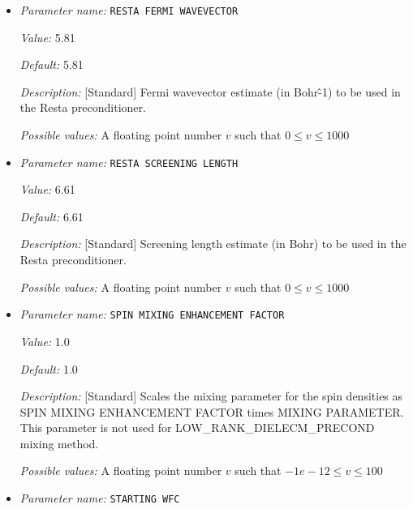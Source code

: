\begin{itemize}
{\it Possible values:} A floating point number $v$ such that $-1e-12 \leq v \leq 1$
\item {\it Parameter name:} {\tt RESTA FERMI WAVEVECTOR}
\label{parameters:SCF parameters/RESTA FERMI WAVEVECTOR}
\label{parameters:SCF_20parameters/RESTA_20FERMI_20WAVEVECTOR}


{\it Value:} 5.81


{\it Default:} 5.81


{\it Description:} [Standard] Fermi wavevector estimate (in Bohr\^-1) to be used in the Resta preconditioner.


{\it Possible values:} A floating point number $v$ such that $0 \leq v \leq 1000$
\item {\it Parameter name:} {\tt RESTA SCREENING LENGTH}
\label{parameters:SCF parameters/RESTA SCREENING LENGTH}
\label{parameters:SCF_20parameters/RESTA_20SCREENING_20LENGTH}


{\it Value:} 6.61


{\it Default:} 6.61


{\it Description:} [Standard] Screening length estimate (in Bohr) to be used in the Resta preconditioner.


{\it Possible values:} A floating point number $v$ such that $0 \leq v \leq 1000$
\item {\it Parameter name:} {\tt SPIN MIXING ENHANCEMENT FACTOR}
\label{parameters:SCF parameters/SPIN MIXING ENHANCEMENT FACTOR}
\label{parameters:SCF_20parameters/SPIN_20MIXING_20ENHANCEMENT_20FACTOR}


{\it Value:} 1.0


{\it Default:} 1.0


{\it Description:} [Standard] Scales the mixing parameter for the spin densities as SPIN MIXING ENHANCEMENT FACTOR times MIXING PARAMETER. This parameter is not used for LOW\_RANK\_DIELECM\_PRECOND mixing method.


{\it Possible values:} A floating point number $v$ such that $-1e-12 \leq v \leq 100$
\item {\it Parameter name:} {\tt STARTING WFC}
\label{parameters:SCF parameters/STARTING WFC}
\label{parameters:SCF_20parameters/STARTING_20WFC}



\end{itemize}
